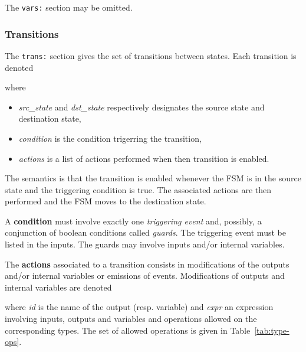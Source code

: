 \begin{center}
\end{center}

The \verb|vars:| section may be omitted.

\subsubsection*{Transitions}
\label{sec:transitions}

The \verb|trans:| section gives the set of transitions between states. Each transition is denoted

\begin{center}
\end{center}

where
\begin{itemize}
\item \emph{src\_state} and \emph{dst\_state} respectively designates the source state and destination state,
\item \emph{condition} is the condition trigerring the transition,
\item \emph{actions} is a list of actions performed when then transition is enabled.
\end{itemize}

\medskip The semantics is that the transition is enabled whenever the FSM is in the source state and
the triggering condition is true. The associated actions are then performed and the FSM moves to the
destination state.

\medskip
A \textbf{condition} must involve exactly one \emph{triggering event} and, possibly, a conjunction of boolean
conditions called \emph{guards}. The triggering event must be listed in the inputs. The guards may
involve inputs and/or internal variables.

\medskip The \textbf{actions} associated to a transition consists in modifications of the outputs
and/or internal variables or emissions of events. Modifications of outputs and internal variables
are denoted

\begin{center}
\end{center}

where \emph{id} is the name of the output (resp. variable) and \emph{expr} an expression involving
inputs, outputs and variables and operations allowed on the corresponding types. The set of allowed
operations is given in Table~\ref{tab:type-ops}.

